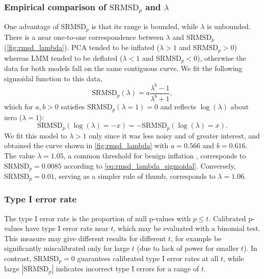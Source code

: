 \documentclass[11pt]{article}
\newcommand{\rmsd}{\text{SRMSD}_p}
\begin{document}
\subsubsection{Empirical comparison of $\rmsd$ and $\lambda$}

One advantage of $\rmsd$ is that its range is bounded, while $\lambda$ is unbounded.
There is a near one-to-one correspondence between $\lambda$ and $\rmsd$ (\cref{fig:rmsd_lambda}).
PCA tended to be inflated ($\lambda > 1$ and $\rmsd > 0$) whereas LMM tended to be deflated ($\lambda < 1$ and $\rmsd < 0$), otherwise the data for both models fall on the same contiguous curve.
We fit the following sigmoidal function to this data,
\begin{equation}
  \label{eq:rmsd_lambda_sigmoidal}
  \rmsd( \lambda ) = a \frac{ \lambda^b - 1 }{ \lambda^b + 1 },
\end{equation}
which for $a,b > 0$ satisfies $\rmsd( \lambda = 1 ) = 0$ and reflects $\log( \lambda )$ about zero ($\lambda = 1$):
$$
\rmsd( \log( \lambda ) = -x ) = - \rmsd( \log( \lambda ) = x ).
$$
We fit this model to $\lambda > 1$ only since it was less noisy and of greater interest, and obtained the curve shown in \cref{fig:rmsd_lambda} with $a = 0.566$ and $b = 0.616$.
The value $\lambda = 1.05$, a common threshold for benign inflation \citep{price_new_2010}, corresponds to $\rmsd = 0.0085$ according to \cref{eq:rmsd_lambda_sigmoidal}.
Conversely, $\rmsd = 0.01$, serving as a simpler rule of thumb, corresponds to $\lambda = 1.06$.

\subsubsection{Type I error rate}

The type I error rate is the proportion of null p-values with $p \le t$.
Calibrated p-values have type I error rate near $t$, which may be evaluated with a binomial test.
This measure may give different results for different $t$, for example be significantly miscalibrated only for large $t$ (due to lack of power for smaller $t$).
In contrast, $\rmsd = 0$ guarantees calibrated type I error rates at all $t$, while large $|\rmsd|$ indicates incorrect type I errors for a range of $t$.
\end{document}
